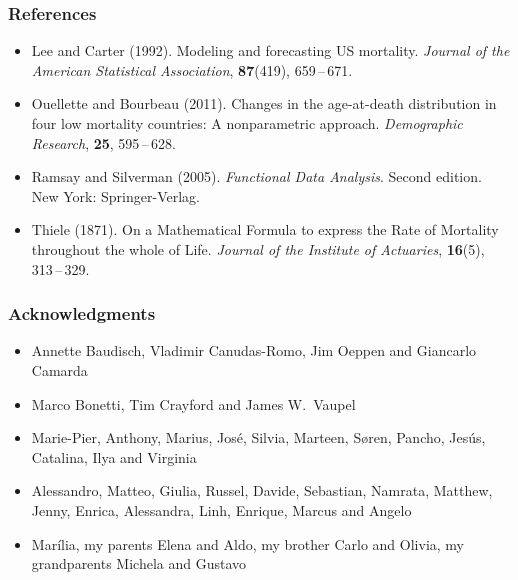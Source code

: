 \documentclass[12pt, xcolor=table]{beamer}  %
\begin{document}
\begin{frame}[noframenumbering]\frametitle{References}
	\scriptsize
	
\begin{itemize}
	\setlength\itemsep{1.2em}
	
	\item[] Lee and Carter (1992). Modeling and forecasting US mortality. {\it Journal of the American Statistical Association}, {\bf 87}(419), 659\,--\,671.
	
	\item[] Ouellette and Bourbeau (2011). Changes in the age-at-death distribution in four low mortality countries: A nonparametric approach. {\it Demographic Research}, {\bf 25}, 595\,--\,628.
	
	\item[] Ramsay and Silverman (2005). \textit{Functional Data Analysis}. Second edition. New York: Springer-Verlag.
	
	\item[] Thiele (1871). On a Mathematical Formula to express the Rate of Mortality throughout the whole of Life. {\it Journal of the Institute of Actuaries}, {\bf 16}(5), 313\,--\,329.
	
\end{itemize}
	
\end{frame}


\begin{frame}[noframenumbering]\frametitle{Acknowledgments}

\small

\begin{itemize}
	\setlength\itemsep{1em}
	
	\item[] Annette Baudisch, Vladimir Canudas-Romo, Jim Oeppen and Giancarlo Camarda \pause
	
	\item[] Marco Bonetti, Tim Crayford and James W.~Vaupel	\pause
	
	\item[] Marie-Pier, Anthony, Marius, Jos{\'e}, Silvia, Marteen, S{\o}ren, Pancho, Jes{\'u}s, Catalina, Ilya and Virginia   \pause
	
	\item[] Alessandro, Matteo, Giulia, Russel, Davide, Sebastian, Namrata, Matthew, Jenny, Enrica, Alessandra, Linh, Enrique, Marcus and Angelo  \pause
	
	\item[]	Mar{\'i}lia, my parents Elena and Aldo, my brother Carlo and Olivia, my grandparents Michela and Gustavo
	
\end{itemize}

\end{frame}
\end{document}
